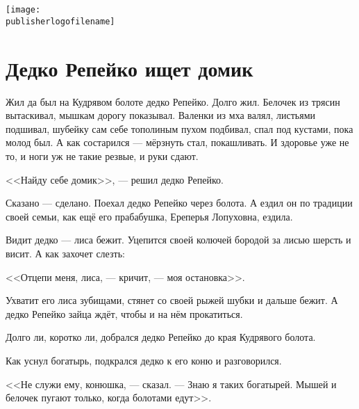 %

\newpage\thispagestyle{plain}~

\begin{titlepage}
{
\centering
{~\par}
\vspace{0.25\textheight}
{\LARGE\bookauthor\par}
\vspace{1.3cm}
{\Huge\textbf{\booktitle}\par}
\vfill
{\texttt{[image: \\publisherlogofilename]}\par}
}
\end{titlepage}

\tableofcontents

\chapter{Дедко Репейко ищет домик}
 
Жил да был на Кудрявом болоте дедко Репейко.
Долго жил.
Белочек из трясин вытаскивал, мышкам дорогу показывал.
Валенки из мха валял, листьями подшивал, шубейку сам себе тополиным пухом подбивал, спал под кустами, пока молод был.
А как состарился --- мёрзнуть стал, покашливать.
И здоровье уже не то, и ноги уж не такие резвые, и руки сдают.

<<Найду себе домик>>, --- решил дедко Репейко.

Сказано --- сделано.
Поехал дедко Репейко через болота.
А ездил он по традиции своей семьи, как ещё его прабабушка, Ереперья Лопуховна, ездила.

Видит дедко --- лиса бежит.
Уцепится своей колючей бородой за лисью шерсть и висит.
А как захочет слезть:

<<Отцепи меня, лиса, --- кричит, --- моя остановка>>.

Ухватит его лиса зубищами, стянет со своей рыжей шубки и дальше бежит.
А дедко Репейко зайца ждёт, чтобы и на нём прокатиться.

Долго ли, коротко ли, добрался дедко Репейко до края Кудрявого болота.

\textspace

Как уснул богатырь, подкрался дедко к его коню и разговорился.

<<Не служи ему, конюшка, --- сказал.
--- Знаю я таких богатырей.
Мышей и белочек пугают только, когда болотами едут>>.

